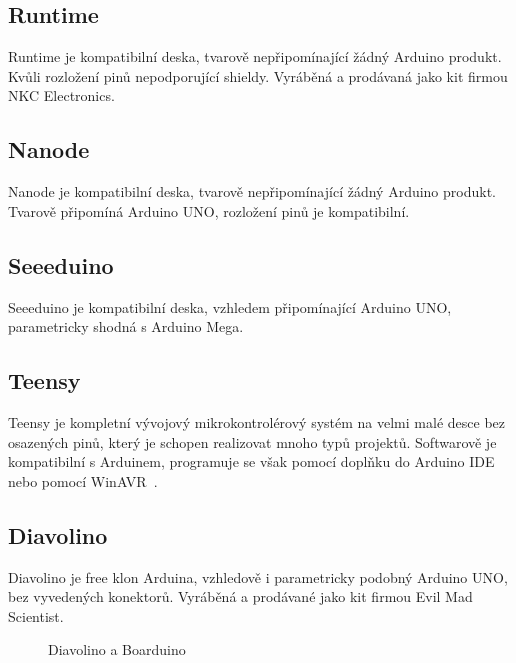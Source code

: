 	\subsection{Runtime} 
	Runtime je kompatibilní deska, tvarově nepřipomínající žádný Arduino produkt. Kvůli rozložení pinů nepodporující shieldy. Vyráběná a prodávaná jako kit firmou NKC Electronics.
	
	\subsection{Nanode} 
	Nanode je kompatibilní deska, tvarově nepřipomínající žádný Arduino produkt. Tvarově připomíná Arduino UNO, rozložení pinů je kompatibilní.
	
	\subsection{Seeeduino} 
	Seeeduino je kompatibilní deska, vzhledem připomínající Arduino UNO, parametricky shodná s Arduino Mega.
	
	\subsection{Teensy}
	Teensy je kompletní vývojový mikrokontrolérový systém na velmi malé desce bez osazených pinů, který je schopen realizovat mnoho typů projektů. Softwarově je kompatibilní s Arduinem, programuje se však pomocí doplňku do Arduino IDE nebo pomocí WinAVR~\cite{ArduinoTeensy}.
	
	\subsection{Diavolino} 
	Diavolino je free klon Arduina, vzhledově i parametricky podobný Arduino UNO, bez vyvedených konektorů. Vyráběná a prodávané jako kit firmou Evil Mad Scientist.
		
\begin{figure}[!ht]
    \centering
			\hspace*{5mm}
					\caption{Diavolino a Boarduino}
	\end{figure}		
	
